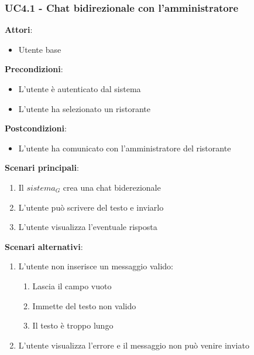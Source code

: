 \subsubsection{UC4.1 - Chat bidirezionale con l'amministratore}\label{usecase:4_1}
\textbf{Attori}:
\begin{itemize}
    \item Utente base
\end{itemize}
\textbf{Precondizioni}:
\begin{itemize}
    \item L'utente è autenticato dal sistema
    \item L'utente ha selezionato un ristorante
\end{itemize}
\textbf{Postcondizioni}:
\begin{itemize}
    \item L'utente ha comunicato con l'amministratore del ristorante
\end{itemize}
\textbf{Scenari principali}:
\begin{enumerate}
    \item Il $\textit{sistema}_G$ crea una chat biderezionale
    \item L'utente può scrivere del testo e inviarlo
    \item L'utente visualizza l'eventuale risposta
\end{enumerate}
\textbf{Scenari alternativi}:
\begin{enumerate}
    \item L'utente non inserisce un messaggio valido:
    \begin{enumerate}
        \item Lascia il campo vuoto
        \item Immette del testo non valido
        \item Il testo è troppo lungo
    \end{enumerate}
    \item L'utente visualizza l'errore e il messaggio non può venire inviato
\end{enumerate}